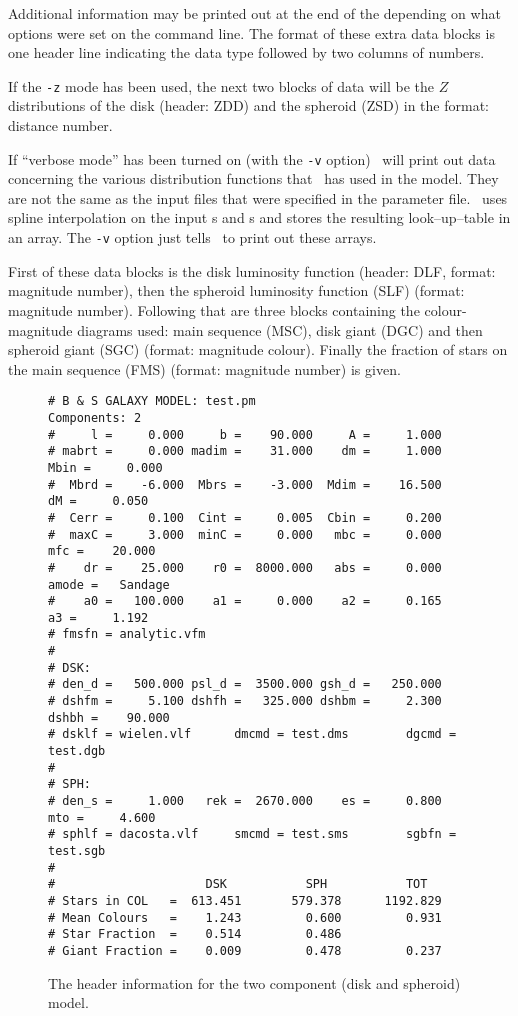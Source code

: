 \documentclass[11pt,twoside]{article}
\begin{document}
Additional information may be printed out at the end of the depending on
what options were set on the command line. The format of these extra data
blocks is one header line indicating the data type followed by two
columns of numbers. 

If the {\tt -z} mode has been used, the next two blocks of data will be the
$Z$ distributions of the disk (header: ZDD) and the spheroid (ZSD) in the
format: distance  number.

If ``verbose mode'' has been turned on (with the {\tt -v} option) \bsm\ will 
print out data concerning the various distribution functions that \bsm\ has 
used in the model. They are not the same as the input files that were 
specified in the parameter file. \bsm\ uses spline interpolation on the input
\lf s and \cmd s and stores the resulting look--up--table in an array.
The  {\tt -v} option just tells \bsm\ to print out these arrays.

First of these data blocks is the disk luminosity function
(header: DLF, format: magnitude  number),  then  the spheroid luminosity
function  (SLF) (format: magnitude  number).  Following  that are
three blocks  containing  the  colour-magnitude  diagrams  used:
main  sequence (MSC),  disk giant (DGC) and then  spheroid giant
(SGC) (format: magnitude colour). Finally the  fraction of stars
on the  main sequence (FMS) (format: magnitude  number) is given.

\begin{figure}[p]
\begin{center}
\begin{verbatim}
# B & S GALAXY MODEL: test.pm                                 Components: 2 
#     l =     0.000     b =    90.000     A =     1.000
# mabrt =     0.000 madim =    31.000    dm =     1.000  Mbin =     0.000
#  Mbrd =    -6.000  Mbrs =    -3.000  Mdim =    16.500    dM =     0.050
#  Cerr =     0.100  Cint =     0.005  Cbin =     0.200
#  maxC =     3.000  minC =     0.000   mbc =     0.000   mfc =    20.000
#    dr =    25.000    r0 =  8000.000   abs =     0.000 amode =   Sandage
#    a0 =   100.000    a1 =     0.000    a2 =     0.165    a3 =     1.192
# fmsfn = analytic.vfm            
#
# DSK:
# den_d =   500.000 psl_d =  3500.000 gsh_d =   250.000
# dshfm =     5.100 dshfh =   325.000 dshbm =     2.300 dshbh =    90.000
# dsklf = wielen.vlf      dmcmd = test.dms        dgcmd = test.dgb       
#
# SPH:
# den_s =     1.000   rek =  2670.000    es =     0.800     mto =     4.600
# sphlf = dacosta.vlf     smcmd = test.sms        sgbfn = test.sgb       
#
#                     DSK           SPH           TOT
# Stars in COL   =  613.451       579.378      1192.829
# Mean Colours   =    1.243         0.600         0.931
# Star Fraction  =    0.514         0.486
# Giant Fraction =    0.009         0.478         0.237
\end{verbatim}
\end{center}
\caption{The header information for the two component (disk and spheroid)
model.}
\end{figure}
\end{document}
